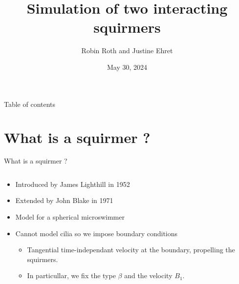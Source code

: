 \documentclass{beamer}
\title{Simulation of two interacting squirmers}
\author{Robin Roth and Justine Ehret}
\institute{Supervised by: Van Landeghem Céline, Giraldi Laetitia}
\date{May 30, 2024}
\begin{document}
\begin{frame}
    \titlepage
\end{frame}

\begin{frame}{Table of contents}
    \tableofcontents
\end{frame}

\section{What is a squirmer ?}
\begin{frame}{What is a squirmer ?}
    \begin{columns}[T]
        \begin{column}{0.5\textwidth}
            \begin{itemize}
                \item Introduced by James Lighthill in 1952 \cite{Wikipedia}
                \item Extended by John Blake in 1971 \cite{Wikipedia}
                \item Model for a spherical microswimmer
                \item Cannot model cilia so we impose boundary conditions
                \begin{itemize}
                    \item Tangential time-independant velocity at the boundary, propelling the squirmers.
                    \item In particullar, we fix the type $\beta$ and the velocity $B_1$.
                \end{itemize}
            \end{itemize}
        \end{column}
        \begin{column}{0.5\textwidth}
            \centering

\end{column}
\end{columns}
\end{frame}
\end{document}
